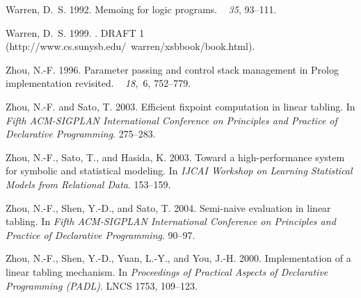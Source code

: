 \documentclass{tlp}
\begin{document}
\begin{thebibliography}{}
{\sc Warren, D.~S.} 1992.
\newblock Memoing for logic programs.
~{\em
  35}, 93--111.

{\sc Warren, D.~S.} 1999.
.
\newblock DRAFT 1 (http://www.cs.sunysb.edu/~warren/xsbbook/book.html).

{\sc Zhou, N.-F.} 1996.
\newblock Parameter passing and control stack management in {Prolog}
  implementation revisited.
~{\em
  18,\/}~6, 752--779.

{\sc Zhou, N.-F.} {\sc and} {\sc Sato, T.} 2003.
\newblock Efficient fixpoint computation in linear tabling.
\newblock In {\em Fifth ACM-SIGPLAN International Conference on Principles and
  Practice of Declarative Programming}. 275--283.

{\sc Zhou, N.-F.}, {\sc Sato, T.}, {\sc and} {\sc Hasida, K.} 2003.
\newblock Toward a high-performance system for symbolic and statistical
  modeling.
\newblock In {\em IJCAI Workshop on Learning Statistical Models from Relational
  Data}. 153--159.

{\sc Zhou, N.-F.}, {\sc Shen, Y.-D.}, {\sc and} {\sc Sato, T.} 2004.
\newblock Semi-naive evaluation in linear tabling.
\newblock In {\em Fifth ACM-SIGPLAN International Conference on Principles and
  Practice of Declarative Programming}. 90--97.

{\sc Zhou, N.-F.}, {\sc Shen, Y.-D.}, {\sc Yuan, L.-Y.}, {\sc and} {\sc You,
  J.-H.} 2000.
\newblock Implementation of a linear tabling mechanism.
\newblock In {\em Proceedings of Practical Aspects of Declarative Programming
  (PADL)}. LNCS 1753, 109--123.

\end{thebibliography}
\end{document}
